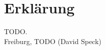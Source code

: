 \thispagestyle{empty}

\vspace*{4cm}

\section*{Erklärung}

TODO.\\[2cm]



Freiburg, TODO \hfill    (David Speck)

